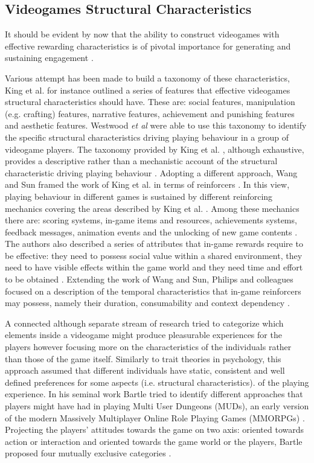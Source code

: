 \subsection{Videogames Structural Characteristics}
\label{factors_engagement}
It should be evident by now that the ability to construct videogames with effective rewarding characteristics is of pivotal importance for generating and sustaining engagement \cite{king2010role, king2010video, yannakakis2013player}. 

Various attempt has been made to build a taxonomy of these characteristics, King et al. \cite{king2010video} for instance outlined a series of features that effective videogames structural characteristics should have. These are: social features, manipulation (e.g. crafting) features, narrative features, achievement and punishing features and aesthetic features. Westwood \textit{et al} \cite{westwood2010role} were able to use this taxonomy to  identify the specific structural characteristics driving playing behaviour in a group of videogame players. The taxonomy provided by King et al. \cite{king2010video}, although exhaustive, provides a descriptive rather than a mechanistic account of the structural characteristic driving playing behaviour \cite{king2010role}. Adopting a different approach, Wang and Sun framed the work of King et al. in terms of reinforcers \cite{king2010video, wang2011game}. In this view, playing behaviour in different games is sustained by different reinforcing mechanics covering the areas described by King et al. \cite{king2010video, wang2011game}. Among these mechanics there are: scoring systems, in-game items and resources, achievements systems, feedback messages, animation events and the unlocking of new game contents \cite{wang2011game}. The authors also described a series of attributes that in-game rewards require to be effective: they need to possess social value within a shared environment, they need to have visible effects within the game world and they need time and effort to be obtained \cite{wang2011game}. Extending the work of Wang and Sun, Philips and colleagues focused on a description of the temporal characteristics that in-game reinforcers may possess, namely their duration, consumability and context dependency \cite{phillips2013videogame}. 

A connected although separate stream of research tried to categorize which elements inside a videogame might produce pleasurable experiences for the players however focusing more on the characteristics of the individuals rather than those of the game itself. Similarly to trait theories in psychology, this approach assumed that different individuals have static, consistent and well defined preferences for some aspects (i.e. structural characteristics). of the playing experience. In his seminal work Bartle tried to identify different approaches that players might have had in playing Multi User Dungeons (MUDs), an early version of the modern Massively Multiplayer Online Role Playing Games (MMORPGs) \cite{bartle1996hearts}. Projecting the players’ attitudes towards the game on two axis: oriented towards action or interaction and oriented towards the game world or the players, Bartle proposed four mutually exclusive categories \cite{bartle1996hearts}.

